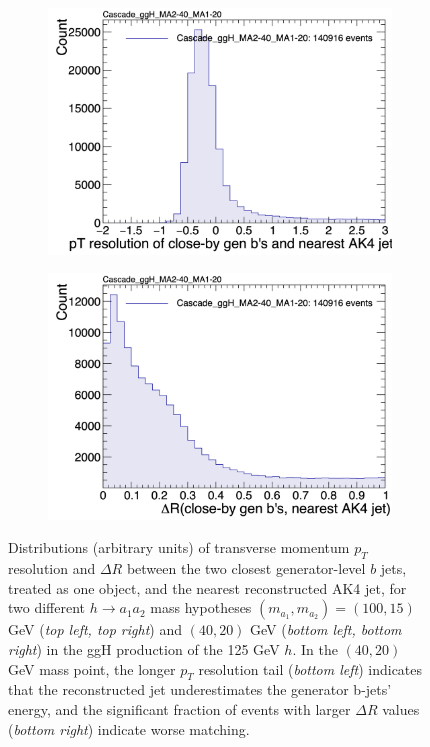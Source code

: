 \begin{figure}[h]
\begin{subfigure}{0.45\textwidth}
        \includegraphics[width=1.0\textwidth]{figures/ch-15-asymmetric/Cascade_ggH_MA2-40_MA1-20_pt_resolution_ak4_leadingPair}
    \end{subfigure}
    \hfill
    \begin{subfigure}{0.45\textwidth}
        \includegraphics[width=1.0\textwidth]{figures/ch-15-asymmetric/Cascade_ggH_MA2-40_MA1-20_deltaR_ak4_leadingPair}
    \end{subfigure}     
    \caption{Distributions (arbitrary units) of transverse momentum $p_{T}$ resolution and $\Delta R$ between the two closest generator-level $b$ jets, treated as one object, and the nearest reconstructed AK4 jet, for two different $h\rightarrow a_1 a_2$ mass hypotheses $(m_{a_1}, m_{a_2}) = (100, 15)$ GeV (\textit{top left, top right}) and $(40, 20)$ GeV (\textit{bottom left, bottom right}) in the ggH production of the 125 GeV $h$. In the $(40, 20)$ GeV mass point, the longer $p_{T}$ resolution tail (\textit{bottom left}) indicates that the reconstructed jet underestimates the generator b-jets' energy, and the significant fraction of events with larger $\Delta R$ values (\textit{bottom right}) indicate worse matching.}
    \label{fig:cascade_matching_to_AK4_jets}
\end{figure}



